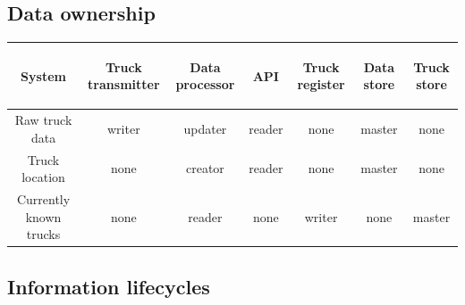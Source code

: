 \documentclass[a4paper,11pt]{report}
\begin{document}
\subsection{Data ownership}
\label{sec:data-ownership}

\begin{tabular}{|c|c|c|c|c|c|c|}
\begin{sideways}\textbf{System}\end{sideways} & \begin{sideways}\textbf{Truck transmitter}\end{sideways} & \begin{sideways}\textbf{Data processor}\end{sideways} & \begin{sideways}\textbf{API}\end{sideways} & \begin{sideways}\textbf{Truck register}\end{sideways} & \begin{sideways}\textbf{Data store}\end{sideways} & \begin{sideways}\textbf{Truck store}\end{sideways} \\\hline
Raw truck data & writer & updater & reader & none & master & none \\\hline
Truck location & none & creator & reader & none & master & none \\\hline
Currently known trucks & none & reader & none & writer & none & master \\\hline
\end{tabular}

\subsection{Information lifecycles}
\label{sec:inform-lifecycl}
\end{document}
